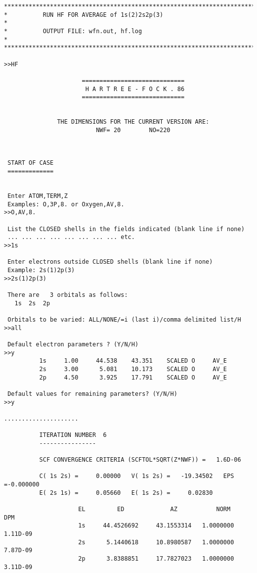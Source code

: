 \documentclass[fleqn,10pt]{book}
\begin{document}
\begin{verbatim}
*******************************************************************************
*          RUN HF FOR AVERAGE of 1s(2)2s2p(3)                                 *
*          OUTPUT FILE: wfn.out, hf.log                                       *
*******************************************************************************

>>HF

                      =============================
                       H A R T R E E - F O C K . 86
                      =============================


               THE DIMENSIONS FOR THE CURRENT VERSION ARE:
                          NWF= 20        NO=220



 START OF CASE
 =============


 Enter ATOM,TERM,Z
 Examples: O,3P,8. or Oxygen,AV,8.
>>O,AV,8.

 List the CLOSED shells in the fields indicated (blank line if none)
 ... ... ... ... ... ... ... ... etc.
>>1s 

 Enter electrons outside CLOSED shells (blank line if none)
 Example: 2s(1)2p(3)
>>2s(1)2p(3)

 There are   3 orbitals as follows:
   1s  2s  2p

 Orbitals to be varied: ALL/NONE/=i (last i)/comma delimited list/H
>>all

 Default electron parameters ? (Y/N/H) 
>>y
          1s     1.00     44.538    43.351    SCALED O     AV_E      
          2s     3.00      5.081    10.173    SCALED O     AV_E      
          2p     4.50      3.925    17.791    SCALED O     AV_E      

 Default values for remaining parameters? (Y/N/H) 
>>y

.....................

          ITERATION NUMBER  6
          ----------------

          SCF CONVERGENCE CRITERIA (SCFTOL*SQRT(Z*NWF)) =   1.6D-06

          C( 1s 2s) =     0.00000   V( 1s 2s) =   -19.34502   EPS =-0.000000
          E( 2s 1s) =     0.05660   E( 1s 2s) =     0.02830

                     EL         ED             AZ           NORM       DPM
                     1s     44.4526692     43.1553314   1.0000000    1.11D-09
                     2s      5.1440618     10.8980587   1.0000000    7.87D-09
                     2p      3.8388851     17.7827023   1.0000000    3.11D-09



\end{verbatim}
\end{document}
